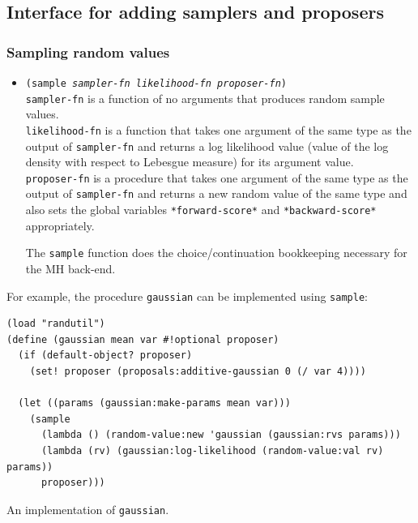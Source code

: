 \documentclass{article}
\begin{document}
\subsection{Interface for adding samplers and proposers}

\subsubsection{Sampling random values}
\begin{itemize}
    \item[] \texttt{(sample \emph{sampler-fn} \emph{likelihood-fn} \emph{proposer-fn})}\\
        \texttt{sampler-fn} is a function of no arguments that produces random sample values.\\
        \texttt{likelihood-fn} is a function that takes one argument of the
        same type as the output of \texttt{sampler-fn} and returns a log
        likelihood value (value of the log density with respect to Lebesgue
        measure) for its argument value.\\
        \texttt{proposer-fn} is a procedure that takes one argument of the same
        type as the output of \texttt{sampler-fn} and returns a new random
        value of the same type and also sets the global variables
        \texttt{*forward-score*} and \texttt{*backward-score*} appropriately.

        The \texttt{sample} function does the choice/continuation bookkeeping
        necessary for the MH back-end.
\end{itemize}

For example, the procedure \texttt{gaussian} can be implemented using \texttt{sample}:

\begin{listing}[H]
\begin{verbatim}
(load "randutil")
(define (gaussian mean var #!optional proposer)
  (if (default-object? proposer)
    (set! proposer (proposals:additive-gaussian 0 (/ var 4))))

  (let ((params (gaussian:make-params mean var)))
    (sample
      (lambda () (random-value:new 'gaussian (gaussian:rvs params)))
      (lambda (rv) (gaussian:log-likelihood (random-value:val rv) params))
      proposer)))
\end{verbatim}
\caption{An implementation of \texttt{gaussian}.}
\label{listing:gaussian}
\end{listing}
\end{document}
